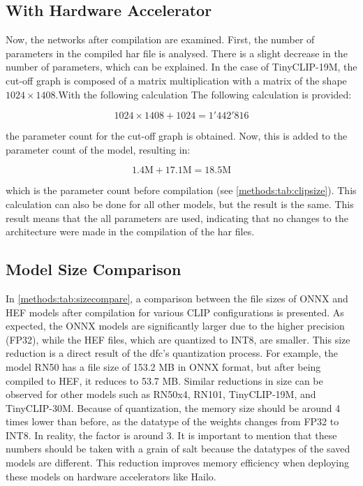 \subsection{With Hardware Accelerator}

Now, the networks after compilation are examined.
First, the number of parameters in the compiled \acrshort{har} file is analysed.
There is a slight decrease in the number of parameters, which can be explained.
In the case of TinyCLIP-19M, the cut-off graph is composed of a matrix multiplication with a matrix of the shape \(1024 \times 1408\).With the following calculation
The following calculation is provided:

\begin{equation*}
    1024 \times 1408 + 1024 = 1'442'816
\end{equation*}

the parameter count for the cut-off graph is obtained. Now, this is added to the parameter count of the model, resulting in:

\begin{equation*}
    1.4 \text{M} + 17.1 \text{M} = 18.5 \text{M} 
\end{equation*}

which is the parameter count before compilation (see \cref{methods:tab:clipsize}).
This calculation can also be done for all other models, but the result is the same.
This result means that the all parameters are used, indicating that no changes to the architecture were made in the compilation of the \acrshort{har} files.


\subsection{Model Size Comparison}

In \cref{methods:tab:sizecompare}, a comparison between the file sizes of ONNX and HEF models after compilation for various CLIP configurations is presented.
As expected, the ONNX models are significantly larger due to the higher precision (FP32), while the HEF files, which are quantized to INT8, are smaller.
This size reduction is a direct result of the \acrshort{dfc}'s quantization process.
For example, the model RN50 has a file size of 153.2 MB in ONNX format, but after being compiled to HEF, it reduces to 53.7 MB.
Similar reductions in size can be observed for other models such as RN50x4, RN101, TinyCLIP-19M, and TinyCLIP-30M.
Because of quantization, the memory size should be around 4 times lower than before, as the datatype of the weights changes from FP32 to INT8.
In reality, the factor is around 3.
It is important to mention that these numbers should be taken with a grain of salt because the datatypes of the saved models are different.
This reduction improves memory efficiency when deploying these models on hardware accelerators like Hailo.

